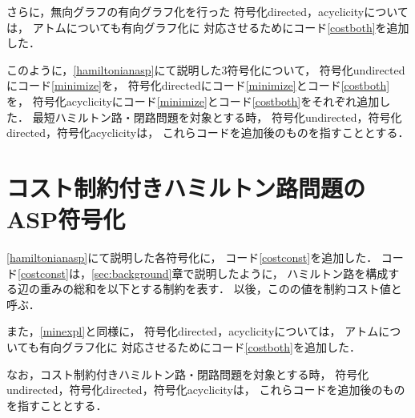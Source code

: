 
さらに，無向グラフの有向グラフ化を行った
符号化directed，acyclicityについては，
アトムについても有向グラフ化に
対応させるためにコード\ref{costboth}を追加した．

このように，\ref{hamiltonianasp}にて説明した3符号化について，
符号化undirectedにコード\ref{minimize}を，
符号化directedにコード\ref{minimize}とコード\ref{costboth}を，
符号化acyclicityにコード\ref{minimize}とコード\ref{costboth}をそれぞれ追加した．
最短ハミルトン路・閉路問題を対象とする時，
符号化undirected，符号化directed，符号化acyclicityは，
これらコードを追加後のものを指すこととする．
\section{コスト制約付きハミルトン路問題のASP符号化}

\ref{hamiltonianasp}にて説明した各符号化に，
コード\ref{costconst}を追加した．
コード\ref{costconst}は，\ref{sec:background}章で説明したように，
ハミルトン路を構成する辺の重みの総和を以下とする制約を表す．
以後，このの値を制約コスト値と呼ぶ．

また，\ref{minexpl}と同様に，
符号化directed，acyclicityについては，
アトムについても有向グラフ化に
対応させるためにコード\ref{costboth}を追加した．

なお，コスト制約付きハミルトン路・閉路問題を対象とする時，
符号化undirected，符号化directed，符号化acyclicityは，
これらコードを追加後のものを指すこととする．
